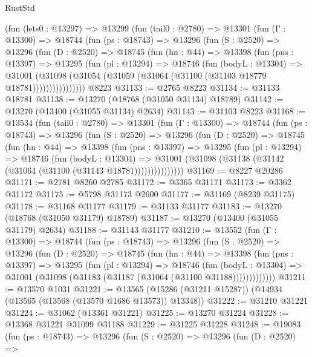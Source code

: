 \begin{lexlean}{RustStd}
\begin{coremodule}
    (fun (lets0 : @13297) =>
    @13299
      (fun (tail0 : @2780) =>
      @13301
        (fun (Γ : @13300) =>
        @18744
          (fun (ps : @18743) =>
          @13296
            (fun (S : @2520) =>
            @13296
              (fun (D : @2520) =>
              @18745
                (fun (hn : @44) =>
                @13398
                  (fun (pns : @13397) =>
                  @13295
                    (fun (pl : @13294) =>
                    @18746
                      (fun (bodyL : @13304) =>
                      @31001
                        (@31098
                          (@31054 (@31059 (@31064 (@31100 (@31103 @18779 @18781))))))))))))))))
    @8223
@31133 := @2765 @8223
@31134 := @31133 @18781
@31138 := @13270 (@18768 (@31050 @31134) @18789)
@31142 := @13270 (@13400 (@31055 @31134) @2634)
@31143 := @31103 @8223
@31168 := @13534
    (fun (tail0 : @2780) =>
    @13301
      (fun (Γ : @13300) =>
      @18744
        (fun (ps : @18743) =>
        @13296
          (fun (S : @2520) =>
          @13296
            (fun (D : @2520) =>
            @18745
              (fun (hn : @44) =>
              @13398
                (fun (pns : @13397) =>
                @13295
                  (fun (pl : @13294) =>
                  @18746
                    (fun (bodyL : @13304) =>
                    @31001 (@31098 (@31138 (@31142 (@31064 (@31100 (@31143 @18781)))))))))))))))
@31169 := @8227 @20286
@31171 := @2781 @8260 @2785
@31172 := @3365 @31171
@31173 := @3362 @31172
@31175 := @5798 @31173 @2600
@31177 := @31169 (@8239 @31175)
@31178 := @31168 @31177
@31179 := @31133 @31177
@31183 := @13270 (@18768 (@31050 @31179) @18789)
@31187 := @13270 (@13400 (@31055 @31179) @2634)
@31188 := @31143 @31177
@31210 := @13552
    (fun (Γ : @13300) =>
    @18744
      (fun (ps : @18743) =>
      @13296
        (fun (S : @2520) =>
        @13296
          (fun (D : @2520) =>
          @18745
            (fun (hn : @44) =>
            @13398
              (fun (pns : @13397) =>
              @13295
                (fun (pl : @13294) =>
                @18746
                  (fun (bodyL : @13304) =>
                  @31001 (@31098 (@31183 (@31187 (@31064 (@31100 @31188)))))))))))))
@31211 := @13570 @1031
@31221 := @13565 (@15286 (@31211 @15287)) (@14934 (@13565 (@13568 (@13570 @1686 @13573)) @13348))
@31222 := @31210 @31221
@31224 := @31062 (@13361 @31221)
@31225 := @13270 @31224
@31228 := @13368 @31221 @31099 @31188
@31229 := @31225 @31228
@31248 := @19083
    (fun (ps : @18743) =>
    @13296
      (fun (S : @2520) =>
      @13296
        (fun (D : @2520) =>

\end{coremodule}
\end{lexlean}
